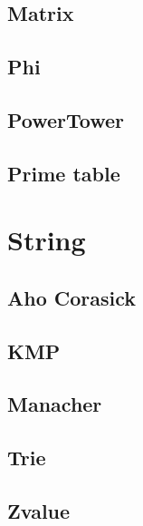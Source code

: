 \subsection{Matrix}

\subsection{Phi}

\subsection{PowerTower}

\subsection{Prime table}


\section{String}

\subsection{Aho Corasick}

\subsection{KMP}

\subsection{Manacher}

\subsection{Trie}

\subsection{Zvalue}

